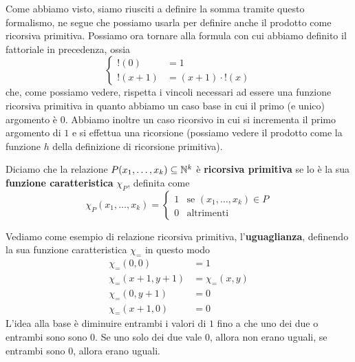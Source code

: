 Come abbiamo visto, siamo riusciti a definire la somma tramite
questo formalismo, ne segue che possiamo usarla per definire
anche il prodotto come ricorsiva primitiva. Possiamo ora
tornare alla formula con cui abbiamo definito il fattoriale
in precedenza, ossia
\[
	\begin{cases}
		!(0)     & = 1                  \\
		!(x + 1) & = (x + 1) \cdot !(x)
	\end{cases}
\]
che, come possiamo vedere, rispetta i vincoli necessari ad
essere una funzione ricorsiva primitiva in quanto abbiamo un
caso base in cui il primo (e unico) argomento è $0$. Abbiamo
inoltre un caso ricorsivo in cui si incrementa il primo
argomento di $1$ e si effettua una ricorsione (possiamo vedere
il prodotto come la funzione $h$ della definizione di ricorsione
primitiva).

\begin{definition}
	Diciamo che la relazione $P(x_1, \dots, x_k) \subseteq \mathbb{N}^k$
	è \textbf{ricorsiva primitiva} se lo è la sua
	\textbf{funzione caratteristica} $\chi_P$, definita come
	\[
		\chi_P (x_1, \dots, x_k) = \begin{cases}
			1 & \text{se } (x_1, \dots, x_k) \in P \\
			0 & \text{altrimenti}
		\end{cases}
	\]
\end{definition}

Vediamo come esempio di relazione ricorsiva primitiva,
l'\textbf{uguaglianza}, definendo la sua funzione
caratteristica $\chi_=$ in questo modo
\begin{align*}
	\chi_= (0, 0)         & = 1             \\
	\chi_= (x + 1, y + 1) & = \chi_= (x, y) \\
	\chi_= (0, y + 1)     & = 0             \\
	\chi_= (x + 1, 0)     & = 0
\end{align*}
L'idea alla base è diminuire entrambi i valori di $1$ fino a
che uno dei due o entrambi sono sono $0$. Se uno solo dei due
vale $0$, allora non erano uguali, se entrambi sono $0$, allora
erano uguali.

